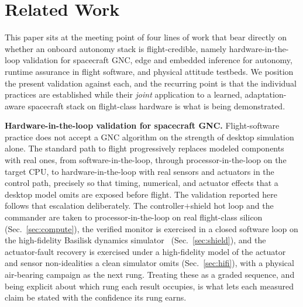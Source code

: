 \documentclass[11pt]{article}
\begin{document}
\section{Related Work}
This paper sits at the meeting point of four lines of work that bear directly on whether an
onboard autonomy stack is flight-credible, namely hardware-in-the-loop validation for spacecraft
GNC, edge and embedded inference for autonomy, runtime assurance in flight software, and physical
attitude testbeds. We position the present validation against each, and the recurring point is
that the individual practices are established while their \emph{joint} application to a learned,
adaptation-aware spacecraft stack on flight-class hardware is what is being demonstrated.

\noindent\textbf{Hardware-in-the-loop validation for spacecraft GNC.} Flight-software practice
does not accept a GNC algorithm on the strength of desktop simulation alone. The standard path to
flight progressively replaces modeled components with real ones, from software-in-the-loop,
through processor-in-the-loop on the target CPU, to hardware-in-the-loop with real sensors and
actuators in the control path, precisely so that timing, numerical, and actuator effects that a
desktop model omits are exposed before flight. The validation reported here follows that
escalation deliberately. The controller$+$shield hot loop and the commander are taken to
processor-in-the-loop on real flight-class silicon (Sec.~\ref{sec:compute}), the verified monitor
is exercised in a closed software loop on the high-fidelity Basilisk dynamics
simulator~\cite{Basilisk} (Sec.~\ref{sec:shield}), and the actuator-fault recovery is exercised
under a high-fidelity model of the actuator and sensor non-idealities a clean simulator omits
(Sec.~\ref{sec:hifi}), with a physical air-bearing campaign as the next rung. Treating these as a
graded sequence, and being explicit about which rung each result occupies, is what lets each
measured claim be stated with the confidence its rung earns.
\end{document}
